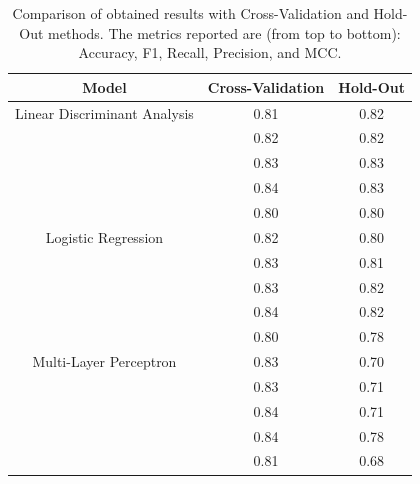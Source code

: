             \begin{table}[htbp]
                \centering
                \begin{tabular}{|c|c|c|}
                \hline
                \textbf{Model} & \textbf{Cross-Validation} & \textbf{Hold-Out} \\ \hline
                    Linear Discriminant Analysis    & 0.81 & 0.82 \\ 
                                                    & 0.82 & 0.82 \\ 
                                                    & 0.83 & 0.83 \\ 
                                                    & 0.84 & 0.83 \\
                                                    & 0.80 & 0.80 \\ 
                                                    \hline
                    Logistic Regression             & 0.82 & 0.80 \\ 
                                                    & 0.83 & 0.81 \\ 
                                                    & 0.83 & 0.82 \\ 
                                                    & 0.84 & 0.82 \\
                                                    & 0.80 & 0.78 \\
                                                    \hline
                    Multi-Layer Perceptron          & 0.83 & 0.70 \\ 
                                                    & 0.83 & 0.71 \\ 
                                                    & 0.84 & 0.71 \\
                                                    & 0.84 & 0.78 \\ 
                                                    & 0.81 & 0.68 \\ 
                                                    \hline
                \end{tabular}
                \caption{Comparison of obtained results with Cross-Validation and Hold-Out methods. The metrics reported are (from top to bottom): Accuracy, F1, Recall, Precision, and MCC.}
                \label{tab:feature_engineering_approach_holdout}
            \end{table}


